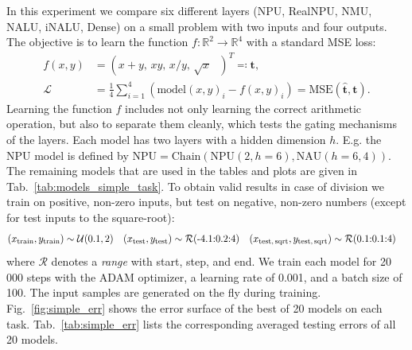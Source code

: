 \documentclass[9pt]{article}
\newcommand{\npu}{\text{NPU}}
\newcommand{\nau}{\text{NAU}}
\newcommand{\chain}{\text{Chain}}
\begin{document}
In this experiment we compare six different layers (NPU, RealNPU, NMU, NALU,
iNALU, Dense) on a small problem with two inputs and four outputs. The
objective is to learn the function $f: \mathbb{R}^2
\rightarrow \mathbb{R}^4$ with a standard MSE loss:
\begin{align}
  \label{eq:simple_f}
  f(x,y) &= (x+y,\, xy,\, x/y,\, \sqrt{x} \text{  })^T \eqqcolon \bm t, \\
  \mathcal L &= \frac{1}{4} \sum_{i=1}^{4}\left(\text{model}(x,y)_i - f(x,y)_i\right)
             = \text{MSE}(\bm{\hat t}, \bm t).
\end{align}
Learning the function $f$ includes not only learning the correct arithmetic operation,
but also to separate them cleanly, which tests the gating mechanisms of the layers.
Each model has two layers with a hidden dimension $h$.  E.g. the NPU model is
defined by $\npu=\chain(\npu(2,h=6),\nau(h=6,4))$.  The remaining models that are
used in the tables and plots are given in Tab.~\ref{tab:models_simple_task}.
To obtain valid results in case of division we train on positive, non-zero
inputs, but test on negative, non-zero numbers (except for test inputs to the
square-root):
\begin{align}
  \label{eq:simple_train}
  (x_{\text{train}}, y_{\text{train}}) &\sim \mathcal{U}(0.1,2) &
  (x_{\text{test}}, y_{\text{test}}) &\sim \mathcal{R}(\text{-4.1:0.2:4}) &
  (x_{\text{test,\,sqrt}}, y_{\text{test,\,sqrt}}) &\sim \mathcal{R}(\text{0.1:0.1:4})
\end{align}
where $\mathcal{R}$ denotes a \emph{range} with start, step, and end.
We train each model for 20\,000 steps with the ADAM optimizer, a learning rate of
0.001, and a batch size of 100. The input samples are generated on the fly
during training. Fig.~\ref{fig:simple_err} shows the error surface of the best
of 20 models on each task. Tab.~\ref{tab:simple_err} lists the corresponding
averaged testing errors of all 20 models.
\end{document}

